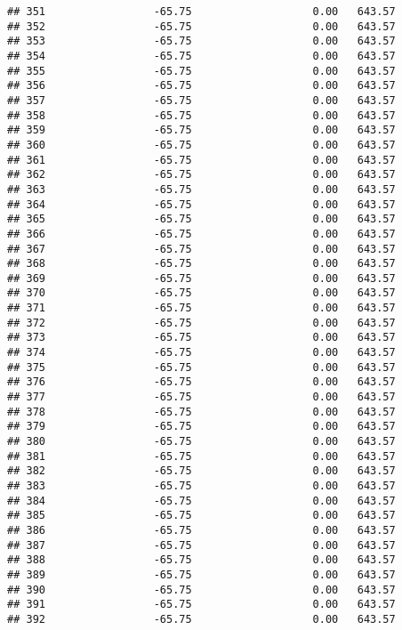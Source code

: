 \documentclass[]{article}
\begin{document}
\begin{verbatim}
## 351                 -65.75                   0.00   643.57
## 352                 -65.75                   0.00   643.57
## 353                 -65.75                   0.00   643.57
## 354                 -65.75                   0.00   643.57
## 355                 -65.75                   0.00   643.57
## 356                 -65.75                   0.00   643.57
## 357                 -65.75                   0.00   643.57
## 358                 -65.75                   0.00   643.57
## 359                 -65.75                   0.00   643.57
## 360                 -65.75                   0.00   643.57
## 361                 -65.75                   0.00   643.57
## 362                 -65.75                   0.00   643.57
## 363                 -65.75                   0.00   643.57
## 364                 -65.75                   0.00   643.57
## 365                 -65.75                   0.00   643.57
## 366                 -65.75                   0.00   643.57
## 367                 -65.75                   0.00   643.57
## 368                 -65.75                   0.00   643.57
## 369                 -65.75                   0.00   643.57
## 370                 -65.75                   0.00   643.57
## 371                 -65.75                   0.00   643.57
## 372                 -65.75                   0.00   643.57
## 373                 -65.75                   0.00   643.57
## 374                 -65.75                   0.00   643.57
## 375                 -65.75                   0.00   643.57
## 376                 -65.75                   0.00   643.57
## 377                 -65.75                   0.00   643.57
## 378                 -65.75                   0.00   643.57
## 379                 -65.75                   0.00   643.57
## 380                 -65.75                   0.00   643.57
## 381                 -65.75                   0.00   643.57
## 382                 -65.75                   0.00   643.57
## 383                 -65.75                   0.00   643.57
## 384                 -65.75                   0.00   643.57
## 385                 -65.75                   0.00   643.57
## 386                 -65.75                   0.00   643.57
## 387                 -65.75                   0.00   643.57
## 388                 -65.75                   0.00   643.57
## 389                 -65.75                   0.00   643.57
## 390                 -65.75                   0.00   643.57
## 391                 -65.75                   0.00   643.57
## 392                 -65.75                   0.00   643.57

\end{verbatim}
\end{document}
